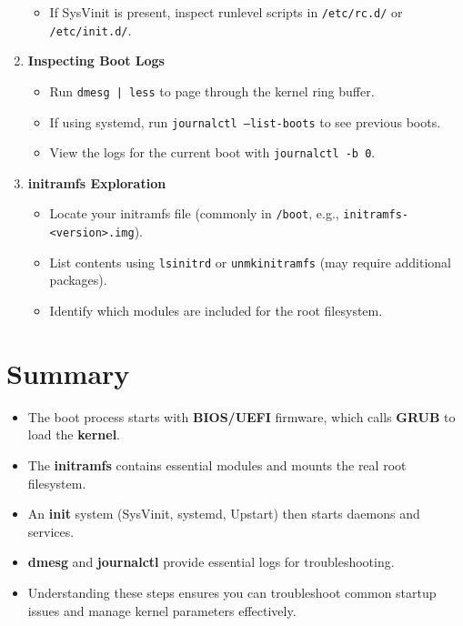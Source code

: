 \documentclass[12pt,a4paper]{report}
\begin{document}
\begin{enumerate}
\begin{itemize}
        \item If SysVinit is present, inspect runlevel scripts in \texttt{/etc/rc.d/} or \texttt{/etc/init.d/}.
    \end{itemize}
    \item \textbf{Inspecting Boot Logs}
    \begin{itemize}
        \item Run \texttt{dmesg | less} to page through the kernel ring buffer.
        \item If using systemd, run \texttt{journalctl --list-boots} to see previous boots.
        \item View the logs for the current boot with \texttt{journalctl -b 0}.
    \end{itemize}
    \item \textbf{initramfs Exploration}
    \begin{itemize}
        \item Locate your initramfs file (commonly in \texttt{/boot}, e.g., \texttt{initramfs-<version>.img}).
        \item List contents using \texttt{lsinitrd} or \texttt{unmkinitramfs} (may require additional packages).
        \item Identify which modules are included for the root filesystem.
    \end{itemize}
\end{enumerate}

\section*{Summary}
\begin{itemize}
    \item The boot process starts with \textbf{BIOS/UEFI} firmware, which calls \textbf{GRUB} to load the \textbf{kernel}.
    \item The \textbf{initramfs} contains essential modules and mounts the real root filesystem.
    \item An \textbf{init} system (SysVinit, systemd, Upstart) then starts daemons and services.
    \item \textbf{dmesg} and \textbf{journalctl} provide essential logs for troubleshooting.
    \item Understanding these steps ensures you can troubleshoot common startup issues and manage kernel parameters effectively.
\end{itemize}
\end{document}
